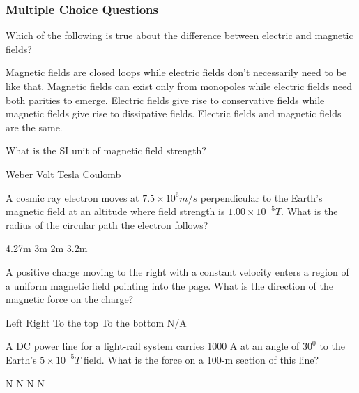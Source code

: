 \documentclass[11pt,addpoints]{exam}
\begin{document}
{{{				\subsubsection*{Multiple Choice Questions}
				\begin{questions}
					\question Which of the following is true about the difference between electric and magnetic fields?
					\begin{choices}
						\choice Magnetic fields are closed loops while electric fields don't necessarily need to be like that.
						\choice Magnetic fields can exist only from monopoles while electric fields need both parities to emerge.
						\choice Electric fields give rise to conservative fields while magnetic fields give rise to dissipative fields.
						\choice Electric fields and magnetic fields are the same.
					\end{choices}
					\question What is the SI unit of magnetic field strength? \\ \begin{oneparchoices}
						\choice Weber
						\choice Volt
						\choice Tesla
						\choice Coulomb
					\end{oneparchoices}
					\question A cosmic ray electron moves at $7.5\times10^{6}m/s$ perpendicular to the Earth’s magnetic field at an altitude where field strength is $1.00\times10^{-5}T$. What is the radius of the circular path the electron follows?\\ \begin{oneparchoices}
						\choice 4.27m
						\choice 3m
						\choice 2m
						\choice 3.2m
					\end{oneparchoices}
					\question A positive charge moving to the right with a constant velocity enters a region of a uniform magnetic field pointing into the page. What is the direction of the magnetic force on the charge?\\ \begin{oneparchoices}
						\choice Left
						\choice Right
						\choice To the top
						\choice To the bottom
						\choice N/A
				\end{oneparchoices}		
					\question A DC power line for a light-rail system carries 1000 A at an angle of $30^0$ to the Earth’s $5\times10^{-5}T$ field. What is the force on a 100-m section of this line?\\ \begin{oneparchoices}
						\choice 2.50 N
						\choice 3.2 N
						\choice 1 N
						\choice 2 N
					\end{oneparchoices}

\end{questions}}}}
\end{document}
